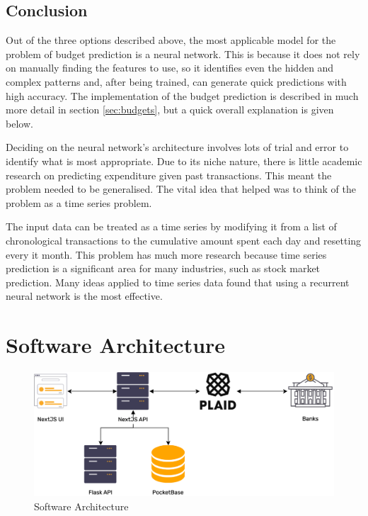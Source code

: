 \subsection{Conclusion}
Out of the three options described above, the most applicable model for the problem of budget prediction is a neural network. This is because it does not rely on manually finding the features to use, so it identifies even the hidden and complex patterns and, after being trained, can generate quick predictions with high accuracy. The implementation of the budget prediction is described in much more detail in section \ref{sec:budgets}, but a quick overall explanation is given below.

Deciding on the neural network's architecture involves lots of trial and error to identify what is most appropriate. Due to its niche nature, there is little academic research on predicting expenditure given past transactions. This meant the problem needed to be generalised. The vital idea that helped was to think of the problem as a time series problem.

The input data can be treated as a time series by modifying it from a list of chronological transactions to the cumulative amount spent each day and resetting every it month. This problem has much more research because time series prediction is a significant area for many industries, such as stock market prediction. Many ideas applied to time series data found that using a recurrent neural network is the most effective.
\section{Software Architecture}

\begin{figure}[H]
	\centering
	\includegraphics[width=\textwidth]{images/software_architecture.png}
	\caption{Software Architecture}
	\label{fig:SoftwareArchitecture}
\end{figure}

